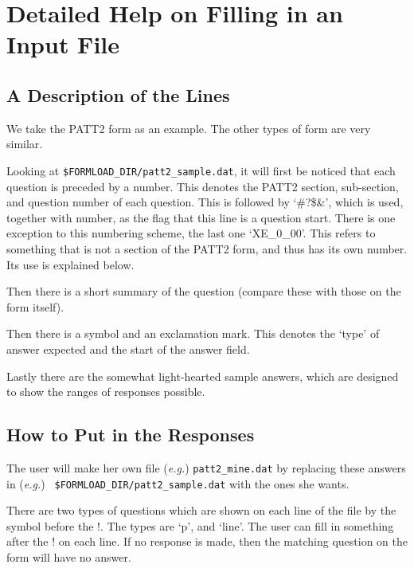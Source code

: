 \section{Detailed Help on Filling in an Input File}
\label{se:details}

\subsection{A Description of the Lines}

We take the PATT2 form as an example. The other types of form are very
similar.

Looking at {\tt \$FORMLOAD\_DIR/patt2\_sample.dat}, it will first be noticed
that each question is preceded by a number. This denotes the PATT2 section,
sub-section, and question number of each question. This is followed by
`\#?\$\&', which is used, together with number, as the flag that this line
is a question start. There is one exception to this numbering scheme, the
last one `XE\_0\_00'. This refers to something that is not a section of the
PATT2 form, and thus has its own number. Its use is explained below.

Then there is a short summary of the question (compare these with those on
the form itself).

Then there is a symbol and an exclamation mark. This denotes the `type' of
answer expected and the start of the answer field.

Lastly there are the somewhat light-hearted sample answers, which are
designed to show the ranges of responses possible.

\subsection{How to Put in the Responses}

The user will make her own file ({\it e.g.}) {\tt patt2\_mine.dat} by
replacing these answers in \newline ({\it e.g.}) {\tt
\$FORMLOAD\_DIR/patt2\_sample.dat} with the ones she wants.

There are two types of questions which are shown on each line of the file
by the symbol before the !. The types are `p', and `line'. The user can
fill in something after the ! on each line. If no response is made, then
the matching question on the form will have no answer.

